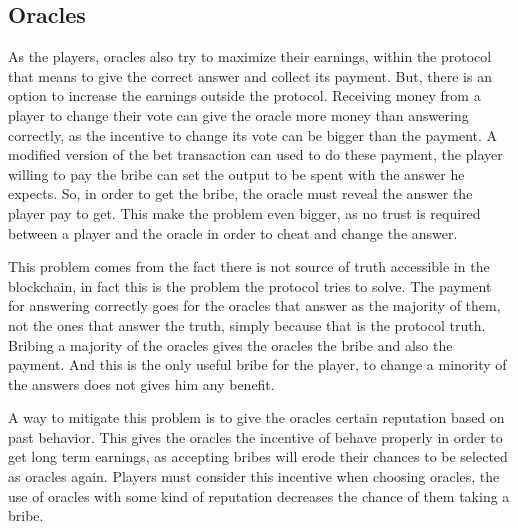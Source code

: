 \subsection{Oracles} \label{subsec:inc_oracles}

As the players, oracles also try to maximize their earnings, within the protocol
  that means to give the correct answer and collect its payment.
But, there is an option to increase the earnings outside the protocol. Receiving
  money from a player to change their vote can give the oracle more money than
  answering correctly, as the incentive to change its vote can be bigger than
  the payment.
A modified version of the bet transaction can used to do these payment, the
  player willing to pay the bribe can set the output to be spent with the answer
  he expects.
So, in order to get the bribe, the oracle must reveal the answer the player pay
  to get.
This make the problem even bigger, as no trust is required between a player and
  the oracle in order to cheat and change the answer.

This problem comes from the fact there is not source of truth accessible in the
  blockchain, in fact this is the problem the protocol tries to solve.
The payment for answering correctly goes for the oracles that answer as the
  majority of them, not the ones that answer the truth, simply because that is
  the protocol truth.
Bribing a majority of the oracles gives the oracles the bribe and also the
  payment.
And this is the only useful bribe for the player, to change a minority of the
  answers does not gives him any benefit.

A way to mitigate this problem is to give the oracles certain reputation based
  on past behavior.
This gives the oracles the incentive of behave properly in order to get long
  term earnings, as accepting bribes will erode their chances to be selected as
  oracles again.
Players must consider this incentive when choosing oracles, the use of oracles
  with some kind of reputation decreases the chance of them taking a bribe.

